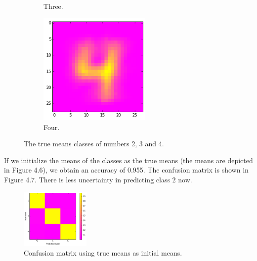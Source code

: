 \documentclass[a4paper,10pt]{article}
\numberwithin{equation}{section} %
\numberwithin{figure}{section} %
\numberwithin{table}{section} %
\theoremstyle{mytheor}
\begin{document}
\begin{enumerate}
\begin{figure}[h]
\begin{subfigure}[b]{0.24\textwidth}
				\caption{Three.}
			\end{subfigure}
			\begin{subfigure}[b]{0.24\textwidth}
				\centering
				\includegraphics[width=0.6\textwidth]{digits/true4.png}\vspace{-0.4cm}
				\caption{Four.}
			\end{subfigure}
   			\caption{\vspace{-0.1cm} The true means classes of numbers 2, 3 and 4.}\vspace{-0.2cm}
  		\end{figure}

		If we initialize the means of the classes as the true means (the means are depicted in Figure 4.6), we obtain an accuracy of 0.955. The confusion matrix is shown in Figure 4.7. There is less uncertainty in predicting class 2 now.
		\begin{figure}[h!]
   			\centering
   			\includegraphics[width=0.3\textwidth]{digits/confusion_perfect.png}\vspace{-0.4cm}
   			\caption{\vspace{-0.1cm} Confusion matrix using true means as initial means.}\vspace{-0.2cm}
  		\end{figure}
\vfill


\end{enumerate}
\end{document}
